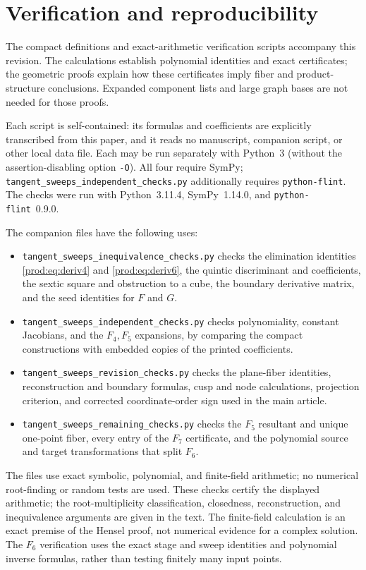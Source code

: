 \documentclass[11pt]{article}
\numberwithin{equation}{section}
\theoremstyle{plain}
\theoremstyle{definition}
\theoremstyle{remark}
\begin{document}
\clearpage
\section{Verification and reproducibility}\label{app:verification}
The compact definitions and exact-arithmetic verification scripts accompany
this revision. The calculations establish polynomial identities and exact
certificates; the geometric proofs explain how these certificates imply
fiber and product-structure conclusions. Expanded component lists and
large graph bases are not needed for those proofs.

Each script is self-contained: its formulas and coefficients are explicitly
transcribed from this paper, and it reads no manuscript, companion script,
or other local data file. Each may be run separately with Python~3
(without the assertion-disabling option \texttt{-O}). All four require SymPy;
\texttt{tangent\_sweeps\_independent\_checks.py} additionally requires
\texttt{python-flint}. The checks were run with Python~3.11.4,
SymPy~1.14.0, and \texttt{python-flint}~0.9.0.

The companion files have the following uses:
\begin{itemize}
\item \texttt{tangent\_sweeps\_inequivalence\_checks.py} checks the
elimination identities \eqref{prod:eq:deriv4} and \eqref{prod:eq:deriv6},
the quintic discriminant and coefficients, the sextic square and obstruction
to a cube, the boundary derivative matrix, and the seed identities for $F$ and $G$.
\item \texttt{tangent\_sweeps\_independent\_checks.py} checks polynomiality,
constant Jacobians, and the $F_4,F_5$ expansions, by comparing the compact
constructions with embedded copies of the printed coefficients.
\item \texttt{tangent\_sweeps\_revision\_checks.py} checks the plane-fiber
identities, reconstruction and boundary formulas, cusp and node calculations,
projection criterion, and corrected coordinate-order sign used in the main
article.
\item \texttt{tangent\_sweeps\_remaining\_checks.py} checks the $F_5$
resultant and unique one-point fiber, every entry of the $F_7$ certificate,
and the polynomial source and target transformations that split $F_6$.
\end{itemize}
The files use exact symbolic, polynomial, and finite-field arithmetic;
no numerical root-finding or random tests are used. These checks certify the
displayed arithmetic; the root-multiplicity classification, closedness,
reconstruction, and inequivalence arguments are given in the text.
The finite-field calculation is an exact premise of the Hensel proof,
not numerical evidence for a complex solution. The $F_6$ verification uses
the exact stage and sweep identities and polynomial inverse formulas,
rather than testing finitely many input points.
\end{document}
